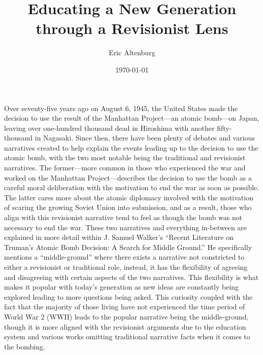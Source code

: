 \documentclass[12pt]{turabian-researchpaper}
\title{Educating a New Generation through a Revisionist Lens}
\author{Eric Altenburg}
\date{\today}
\begin{document}
\maketitle

Over seventy-five years ago on August 6, 1945, the United States made the decision to use the result of the Manhattan Project—an atomic bomb—on Japan, leaving over one-hundred thousand dead in Hiroshima with another fifty-thousand in Nagasaki. Since then, there have been plenty of debates and various narratives created to help explain the events leading up to the decision to use the atomic bomb, with the two most notable being the traditional and revisionist narratives. The former—more common in those who experienced the war and worked on the Manhattan Project—describes the decision to use the bomb as a careful moral deliberation with the motivation to end the war as soon as possible. The latter cares more about the atomic diplomacy involved with the motivation of scaring the growing Soviet Union into submission, and as a result, those who align with this revisionist narrative tend to feel as though the bomb was not necessary to end the war. These two narratives and everything in-between are explained in more detail within J. Samuel Walker’s “Recent Literature on Truman’s Atomic Bomb Decision: A Search for Middle Ground.” He specifically mentions a “middle-ground” where there exists a narrative not constricted to either a revisionist or traditional role, instead, it has the flexibility of agreeing and disagreeing with certain aspects of the two narratives. This flexibility is what makes it popular with today’s generation as new ideas are constantly being explored leading to more questions being asked. This curiosity coupled with the fact that the majority of those living have not experienced the time period of World War 2 (WWII) leads to the popular narrative being the middle-ground, though it is more aligned with the revisionist arguments due to the education system and various works omitting traditional narrative facts when it comes to the bombing.
\end{document}
